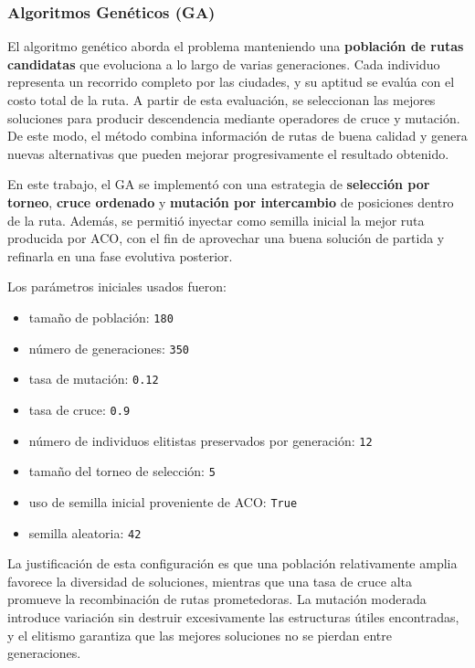 \documentclass[
  12pt,
  letterpaper,
  DIV=11,
  numbers=noendperiod]{scrartcl}
\providecommand{\tightlist}{%
  \setlength{\itemsep}{0pt}\setlength{\parskip}{0pt}}
\begin{document}
\subsubsection{Algoritmos Genéticos
(GA)}\label{algoritmos-genuxe9ticos-ga}

El algoritmo genético aborda el problema manteniendo una
\textbf{población de rutas candidatas} que evoluciona a lo largo de
varias generaciones. Cada individuo representa un recorrido completo por
las ciudades, y su aptitud se evalúa con el costo total de la ruta. A
partir de esta evaluación, se seleccionan las mejores soluciones para
producir descendencia mediante operadores de cruce y mutación. De este
modo, el método combina información de rutas de buena calidad y genera
nuevas alternativas que pueden mejorar progresivamente el resultado
obtenido.

En este trabajo, el GA se implementó con una estrategia de
\textbf{selección por torneo}, \textbf{cruce ordenado} y
\textbf{mutación por intercambio} de posiciones dentro de la ruta.
Además, se permitió inyectar como semilla inicial la mejor ruta
producida por ACO, con el fin de aprovechar una buena solución de
partida y refinarla en una fase evolutiva posterior.

Los parámetros iniciales usados fueron:

\begin{itemize}
\tightlist
\item
  tamaño de población: \texttt{180}
\item
  número de generaciones: \texttt{350}
\item
  tasa de mutación: \texttt{0.12}
\item
  tasa de cruce: \texttt{0.9}
\item
  número de individuos elitistas preservados por generación: \texttt{12}
\item
  tamaño del torneo de selección: \texttt{5}
\item
  uso de semilla inicial proveniente de ACO: \texttt{True}
\item
  semilla aleatoria: \texttt{42}
\end{itemize}

La justificación de esta configuración es que una población
relativamente amplia favorece la diversidad de soluciones, mientras que
una tasa de cruce alta promueve la recombinación de rutas prometedoras.
La mutación moderada introduce variación sin destruir excesivamente las
estructuras útiles encontradas, y el elitismo garantiza que las mejores
soluciones no se pierdan entre generaciones.
\end{document}
